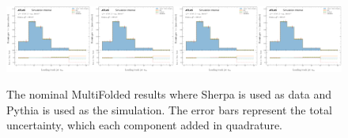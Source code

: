\begin{figure}[h!]
\includegraphics[width=0.25\textwidth,page=21]{figures/SimResults/TotalErrors.pdf}\includegraphics[width=0.25\textwidth,page=22]{figures/SimResults/TotalErrors.pdf}\includegraphics[width=0.25\textwidth,page=23]{figures/SimResults/TotalErrors.pdf}\includegraphics[width=0.25\textwidth,page=24]{figures/SimResults/TotalErrors.pdf}
\caption{The nominal MultiFolded results where Sherpa is used as data and Pythia is used as the simulation. The error bars represent the total uncertainty, which each component added in quadrature.}
\label{fig:simresultsmulti_nominal}
\end{figure}


